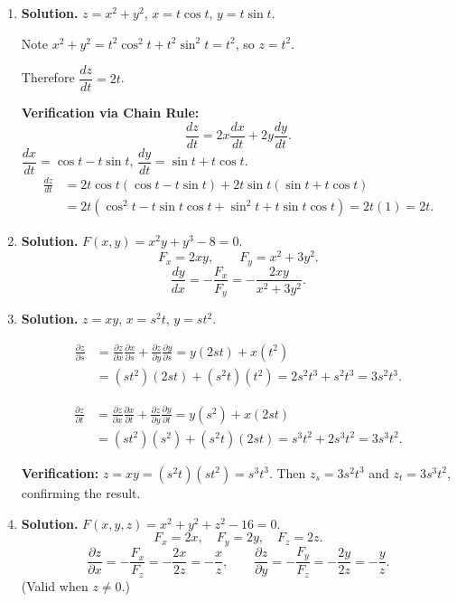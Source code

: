 \begin{enumerate}

\item \textbf{Solution.}
$z = x^2 + y^2$, $x = t\cos t$, $y = t\sin t$.

Note $x^2 + y^2 = t^2\cos^2 t + t^2\sin^2 t = t^2$, so $z = t^2$.

Therefore $\dfrac{dz}{dt} = \boxed{2t}$.

\textbf{Verification via Chain Rule:}
\[
\frac{dz}{dt} = 2x\frac{dx}{dt} + 2y\frac{dy}{dt}.
\]
$\dfrac{dx}{dt} = \cos t - t\sin t$, $\dfrac{dy}{dt} = \sin t + t\cos t$.
\begin{align*}
\frac{dz}{dt} &= 2t\cos t(\cos t - t\sin t) + 2t\sin t(\sin t + t\cos t)\\
&= 2t(\cos^2 t - t\sin t\cos t + \sin^2 t + t\sin t\cos t) = 2t(1) = 2t.
\end{align*}

\item \textbf{Solution.}
$F(x,y) = x^2y + y^3 - 8 = 0$.
\[
F_x = 2xy, \qquad F_y = x^2 + 3y^2.
\]
\[
\frac{dy}{dx} = -\frac{F_x}{F_y} = \boxed{-\frac{2xy}{x^2 + 3y^2}}.
\]

\item \textbf{Solution.}
$z = xy$, $x = s^2t$, $y = st^2$.

\begin{align*}
\frac{\partial z}{\partial s} &= \frac{\partial z}{\partial x}\frac{\partial x}{\partial s} + \frac{\partial z}{\partial y}\frac{\partial y}{\partial s} = y(2st) + x(t^2) \\
&= (st^2)(2st) + (s^2t)(t^2) = 2s^2t^3 + s^2t^3 = 3s^2t^3.
\end{align*}

\begin{align*}
\frac{\partial z}{\partial t} &= \frac{\partial z}{\partial x}\frac{\partial x}{\partial t} + \frac{\partial z}{\partial y}\frac{\partial y}{\partial t} = y(s^2) + x(2st) \\
&= (st^2)(s^2) + (s^2t)(2st) = s^3t^2 + 2s^3t^2 = 3s^3t^2.
\end{align*}

\textbf{Verification:} $z = xy = (s^2t)(st^2) = s^3t^3$. Then $z_s = 3s^2t^3$ and $z_t = 3s^3t^2$, confirming the result.

\item \textbf{Solution.}
$F(x,y,z) = x^2 + y^2 + z^2 - 16 = 0$.
\[
F_x = 2x, \quad F_y = 2y, \quad F_z = 2z.
\]
\[
\frac{\partial z}{\partial x} = -\frac{F_x}{F_z} = -\frac{2x}{2z} = \boxed{-\frac{x}{z}}, \qquad \frac{\partial z}{\partial y} = -\frac{F_y}{F_z} = -\frac{2y}{2z} = \boxed{-\frac{y}{z}}.
\]
(Valid when $z \neq 0$.)


\end{enumerate}
